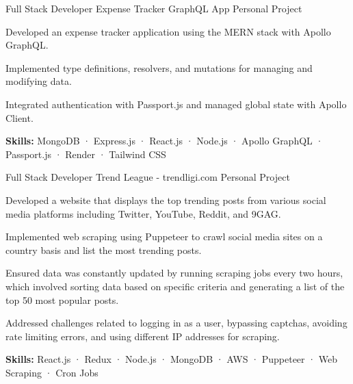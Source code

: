 

\begin{cventries}

  \cventry
    {Full Stack Developer} %
    {Expense Tracker GraphQL App} %
    {Personal Project} %
    {}
    {
      \begin{cvitems} %
        \item {Developed an expense tracker application using the MERN stack with Apollo GraphQL.}
        \item {Implemented type definitions, resolvers, and mutations for managing and modifying data.}
        \item {Integrated authentication with Passport.js and managed global state with Apollo Client.}
        \item {\textbf {Skills:} MongoDB · Express.js · React.js · Node.js · Apollo GraphQL · Passport.js · Render · Tailwind CSS}
      \end{cvitems}
    }

    \cventry
    {Full Stack Developer} %
    {Trend League - trendligi.com} %
    {Personal Project} %
    {}
    {
      \begin{cvitems} %
        \item {Developed a website that displays the top trending posts from various social media platforms including Twitter, YouTube, Reddit, and 9GAG.}
        \item {Implemented web scraping using Puppeteer to crawl social media sites on a country basis and list the most trending posts.}
        \item {Ensured data was constantly updated by running scraping jobs every two hours, which involved sorting data based on specific criteria and generating a list of the top 50 most popular posts.}
        \item {Addressed challenges related to logging in as a user, bypassing captchas, avoiding rate limiting errors, and using different IP addresses for scraping.}
        \item {\textbf {Skills:} React.js · Redux · Node.js · MongoDB · AWS · Puppeteer · Web Scraping · Cron Jobs}
      \end{cvitems}
    }


\end{cventries}
